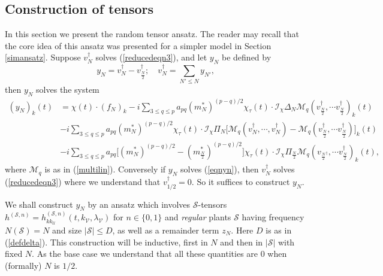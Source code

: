 \documentclass[11 pt,reqno]{amsart}
\theoremstyle{definition}
\theoremstyle{remark}
\numberwithin{equation}{section}
\newcommand{\Sc}{\mathcal{S}}
\newcommand{\Ic}{\mathcal{I}}
\newcommand{\Uc}{\mathcal{U}}
\newcommand{\Vc}{\mathcal{V}}
\renewcommand{\Mc}{\mathcal{M}}
\begin{document}
{ \subsection{Construction of tensors}\label{constructansatz} In this section we present the random tensor ansatz. The reader may recall that the core idea of this ansatz was presented for a simpler model in Section \ref{simansatz}. Suppose $v_N^\dagger$ solves (\ref{reducedeqn3}), and let $y_N$ be defined by
  \begin{equation}\label{defyndagger}y_N=v_N^\dagger-v_{\frac{N}{2}}^\dagger;\quad v_N^\dagger=\sum_{N'\leq N}y_{N'},\end{equation} then $y_N$ solves the system
   \begin{equation}\label{eqnyn}
 \begin{split}(y_N)_k(t)&=\chi(t)\cdot (f_N)_k-i\sum_{3\leq q\leq p}a_{pq}(m_N^*)^{(p-q)/2}\chi_\tau(t)\cdot\Ic_\chi\Delta_N\Mc_q(v_{\frac{N}{2}}^\dagger,\cdots v_{\frac{N}{2}}^\dagger)_k(t)\\
 &-i\sum_{3\leq q\leq p}a_{pq}(m_N^*)^{(p-q)/2}\chi_\tau(t)\cdot\Ic_\chi\Pi_N\big[\Mc_q(v_N^\dagger,\cdots,v_N^\dagger)-\Mc_q(v_{\frac{N}{2}}^\dagger,\cdots v_{\frac{N}{2}}^\dagger)\big]_k(t)\\
 &-i\sum_{3\leq q\leq p}a_{pq}\big[(m_N^*)^{(p-q)/2}-(m_{\frac{N}{2}}^*)^{(p-q)/2}\big]\chi_\tau(t)\cdot\Ic_\chi\Pi_{\frac{N}{2}}\Mc_q(v_{\frac{N}{2}^\dagger},\cdots v_{\frac{N}{2}}^\dagger)_k(t),
 \end{split}
 \end{equation} where $\Mc_q$ is as in (\ref{multilin}). Conversely if $y_N$ solves (\ref{eqnyn}), then $v_N^\dagger$ solves (\ref{reducedeqn3}) where we understand that $v_{1/2}^\dagger=0$. So it suffices to construct $y_N$.
 
 We shall construct $y_N$ by an ansatz which involves $\Sc$-tensors $h^{(\Sc,n)}=h_{kk_\Uc}^{(\Sc,n)}(t,k_\Vc,\lambda_\Vc)$  for $n\in\{0,1\}$ and \emph{regular} plants $\Sc$ having frequency $N(\Sc)=N$ and size $|\Sc|\leq D$, as well as a remainder term $z_N$. Here $D$ is as in (\ref{defdelta}). This construction will be inductive, first in $N$ and then in $|\Sc|$ with fixed $N$. As the base case we understand that all these quantities are $0$ when (formally) $N$ is $1/2$.
 
}
\end{document}
